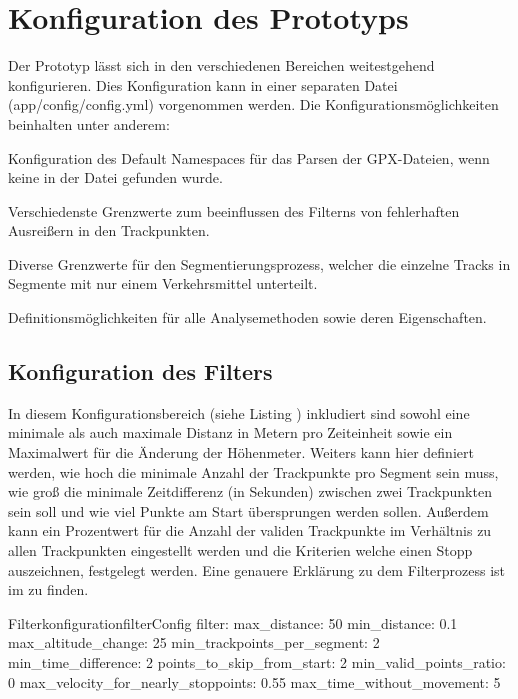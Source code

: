 
\section{Konfiguration des Prototyps}
Der Prototyp lässt sich in den verschiedenen Bereichen weitestgehend konfigurieren. Dies Konfiguration kann in einer separaten Datei (app/config/config.yml) vorgenommen werden. Die Konfigurationsmöglichkeiten beinhalten unter anderem:
\begin{pitemize}
\item Konfiguration des Default Namespaces für das Parsen der GPX-Dateien, wenn keine in der Datei gefunden wurde.
\item Verschiedenste Grenzwerte zum beeinflussen des Filterns von fehlerhaften Ausreißern in den Trackpunkten.
\item Diverse Grenzwerte für den Segmentierungsprozess, welcher die einzelne Tracks in Segmente mit nur einem Verkehrsmittel unterteilt.
\item Definitionsmöglichkeiten für alle Analysemethoden sowie deren Eigenschaften.
\end{pitemize}

\subsection{Konfiguration des Filters}
In diesem Konfigurationsbereich (siehe Listing ) inkludiert sind sowohl eine minimale als auch maximale Distanz in Metern pro Zeiteinheit sowie ein Maximalwert für die Änderung der Höhenmeter. Weiters kann hier definiert werden, wie hoch die minimale Anzahl der Trackpunkte pro Segment sein muss, wie groß die minimale Zeitdifferenz (in Sekunden) zwischen zwei Trackpunkten sein soll und wie viel Punkte am Start übersprungen werden sollen. Außerdem kann ein Prozentwert für die Anzahl der validen Trackpunkte im Verhältnis zu allen Trackpunkten eingestellt werden und die Kriterien welche einen Stopp auszeichnen, festgelegt werden. Eine genauere Erklärung zu dem Filterprozess ist im  zu finden.

\begin{code}[]{Filterkonfiguration}{filterConfig}
  filter:
    max_distance: 50
    min_distance: 0.1
    max_altitude_change: 25
    min_trackpoints_per_segment: 2
    min_time_difference: 2
    points_to_skip_from_start: 2
    min_valid_points_ratio: 0
    max_velocity_for_nearly_stoppoints: 0.55
    max_time_without_movement: 5
\end{code}


